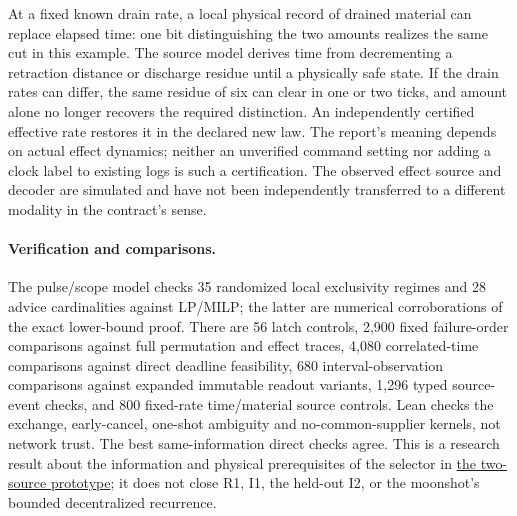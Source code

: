 \documentclass{article}
\begin{document}
At a fixed known drain rate, a local physical record of drained material can replace elapsed time: one bit distinguishing the two amounts realizes the same cut in this example. The source model derives time from decrementing a retraction distance or discharge residue until a physically safe state. If the drain rates can differ, the same residue of six can clear in one or two ticks, and amount alone no longer recovers the required distinction. An independently certified effective rate restores it in the declared new law. The report's meaning depends on actual effect dynamics; neither an unverified command setting nor adding a clock label to existing logs is such a certification. The observed effect source and decoder are simulated and have not been independently transferred to a different modality in the contract's sense.

\paragraph{Verification and comparisons.}
The pulse/scope model checks 35 randomized local exclusivity regimes and 28 advice cardinalities against LP/MILP; the latter are numerical corroborations of the exact lower-bound proof. There are 56 latch controls, 2,900 fixed failure-order comparisons against full permutation and effect traces, 4,080 correlated-time comparisons against direct deadline feasibility, 680 interval-observation comparisons against expanded immutable readout variants, 1,296 typed source-event checks, and 800 fixed-rate time/material source controls. Lean checks the exchange, early-cancel, one-shot ambiguity and no-common-supplier kernels, not network trust. The best same-information direct checks agree. This is a research result about the information and physical prerequisites of the selector in \href{https://github.com/eternal-november/eos-research-programmes/pull/385}{the two-source prototype}; it does not close R1, I1, the held-out I2, or the moonshot's bounded decentralized recurrence.
\end{document}
